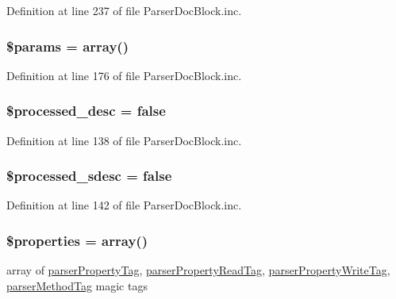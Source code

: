 \-Definition at line 237 of file \-Parser\-Doc\-Block.\-inc.

\hypertarget{classparser_doc_block_afe68e6fbe7acfbffc0af0c84a1996466}{
\subsubsection[{\$params}]{\setlength{\rightskip}{0pt plus 5cm}\$params = array()}}\label{classparser_doc_block_afe68e6fbe7acfbffc0af0c84a1996466}


\-Definition at line 176 of file \-Parser\-Doc\-Block.\-inc.

\hypertarget{classparser_doc_block_ad6a3ff14bcbf8707f2c8b1838aa68531}{
\subsubsection[{\$processed\-\_\-desc}]{\setlength{\rightskip}{0pt plus 5cm}\$processed\-\_\-desc = false}}\label{classparser_doc_block_ad6a3ff14bcbf8707f2c8b1838aa68531}


\-Definition at line 138 of file \-Parser\-Doc\-Block.\-inc.

\hypertarget{classparser_doc_block_aacdabb7deea30aa8da786f3fd24c2f13}{
\subsubsection[{\$processed\-\_\-sdesc}]{\setlength{\rightskip}{0pt plus 5cm}\$processed\-\_\-sdesc = false}}\label{classparser_doc_block_aacdabb7deea30aa8da786f3fd24c2f13}


\-Definition at line 142 of file \-Parser\-Doc\-Block.\-inc.

\hypertarget{classparser_doc_block_a7f675de4b5983d7e84f6573b7d4d453d}{
\subsubsection[{\$properties}]{\setlength{\rightskip}{0pt plus 5cm}\$properties = array()}}\label{classparser_doc_block_a7f675de4b5983d7e84f6573b7d4d453d}
array of \hyperlink{classparser_property_tag}{parser\-Property\-Tag}, \hyperlink{classparser_property_read_tag}{parser\-Property\-Read\-Tag}, \hyperlink{classparser_property_write_tag}{parser\-Property\-Write\-Tag}, \hyperlink{classparser_method_tag}{parser\-Method\-Tag} magic tags 

